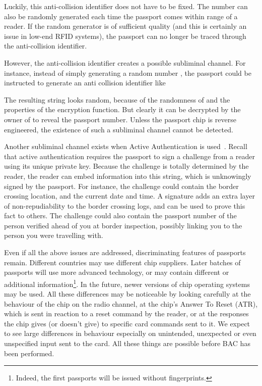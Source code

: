\documentclass[runningheads,envcountsame,envcountsect,oribibl]{llncs}
\begin{document}
Luckily, this anti-collision identifier does not have to be fixed. The
number can also be randomly generated each time the passport comes within range
of a reader. 
If the random generator is of sufficient quality (and this is certainly an
issue in low-end RFID systems), the passport can no longer be traced
through the anti-collision identifier.

However, the anti-collision identifier creates a possible subliminal
channel. For instance, instead of simply generating a random number ,
the passport could be instructed to generate an anti collision identifier 
like

The resulting string looks random, because of the randomness of  and the
properties of the encryption function. But clearly it can be decrypted
by the owner of  to reveal the passport number.
Unless the passport chip is reverse engineered, the existence of such a
subliminal channel cannot be detected.

Another subliminal channel exists when Active
Authentication is used~\cite{bsi2006extendedaccesscontrol}. 
Recall that active authentication requires the
passport to sign a challenge from a reader
using its unique private key.
Because the challenge is totally determined by the reader, the reader
can embed information into this string, which is unknowingly signed by the
passport. For instance, the challenge could contain the border crossing
location, and the current
date and time. A signature adds an extra layer
of non-repudiability to the border crossing logs, and can be used to prove this
fact to others. 
The challenge could also contain
the passport number of the person verified ahead of you at border inspection,
possibly linking you to the person you were travelling with.

Even if all the above issues are addressed,
discriminating features of passports remain. Different countries may
use different chip suppliers. Later batches of passports will use more
advanced technology, or may contain different or additional
information\footnote{Indeed, the first passports will be issued
without fingerprints.}.  In the future, newer versions
of chip operating systems may be used.  All these differences may be
noticeable by looking carefully at the behaviour of the chip on the
radio channel, at the chip's Answer To Reset (ATR), which is sent in
reaction to a reset command by the reader, or at the responses the
chip gives (or doesn't give) to specific card commands sent to it. We
expect to see large differences in behaviour especially on unintended,
unexpected or even unspecified input sent to the
card.
All these things are
possible before BAC has been performed.
\end{document}
